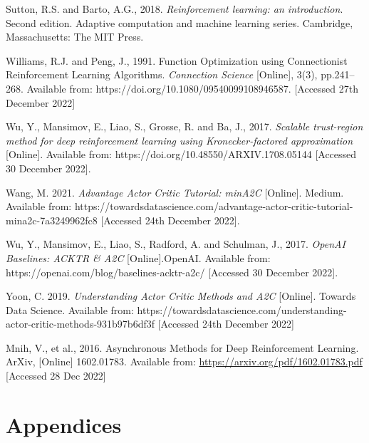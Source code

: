 \documentclass{article}
\begin{document}
Sutton, R.S. and Barto, A.G., 2018. \emph{Reinforcement learning: an introduction}. Second edition. Adaptive computation and machine learning series. Cambridge, Massachusetts: The MIT Press.

Williams, R.J. and Peng, J., 1991. Function Optimization using Connectionist Reinforcement Learning Algorithms. \emph{Connection Science} [Online], 3(3), pp.241–268. Available from: https://doi.org/10.1080/09540099108946587. [Accessed 27th December 2022]

Wu, Y., Mansimov, E., Liao, S., Grosse, R. and Ba, J., 2017. \emph{Scalable trust-region method for deep reinforcement learning using Kronecker-factored approximation} [Online]. Available from: https://doi.org/10.48550/ARXIV.1708.05144 [Accessed 30 December 2022].

Wang, M. 2021. \emph{Advantage Actor Critic Tutorial: minA2C} [Online]. Medium. Available from: https://towardsdatascience.com/advantage-actor-critic-tutorial-mina2c-7a3249962fc8 [Accessed 24th December 2022].

Wu, Y., Mansimov, E., Liao, S., Radford, A. and Schulman, J., 2017. \emph{OpenAI Baselines: ACKTR \& A2C} [Online].OpenAI. Available from: https://openai.com/blog/baselines-acktr-a2c/ [Accessed 30 December 2022].

Yoon, C. 2019. \emph{Understanding Actor Critic Methods and A2C} [Online]. Towards Data Science. Available from: https://towardsdatascience.com/understanding-actor-critic-methods-931b97b6df3f [Accessed 24th December 2022]


\small

Mnih, V., et al., 2016. Asynchronous Methods for Deep Reinforcement Learning. ArXiv, [Online] 1602.01783.
Available from: \url{https://arxiv.org/pdf/1602.01783.pdf} [Accessed 28 Dec 2022]

\normalsize
\newpage
\section*{Appendices}
\end{document}
